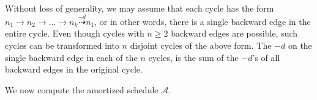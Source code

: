 \documentclass[sigconf, screen, natbib=false, dvipsnames, table]{acmart}
\theoremstyle{definition}
\begin{document}
Without loss of generality, we may assume that each cycle has the form $n_1 \rightarrow n_2 \rightarrow ... \rightarrow n_k \stackrel{-d}{\dasharrow} n_1$, 
or in other words, there is a single backward edge in the entire cycle. Even though cycles with $n \ge 2$ backward 
edges are possible, such cycles can be transformed into $n$ disjoint cycles of the above form. The $-d$ on the
single backward edge in each of the $n$ cycles, is the sum of the $-d$'s of all backward edges in the original cycle. 

We now compute the amortized schedule $\mathcal{A}$. 
\end{document}
